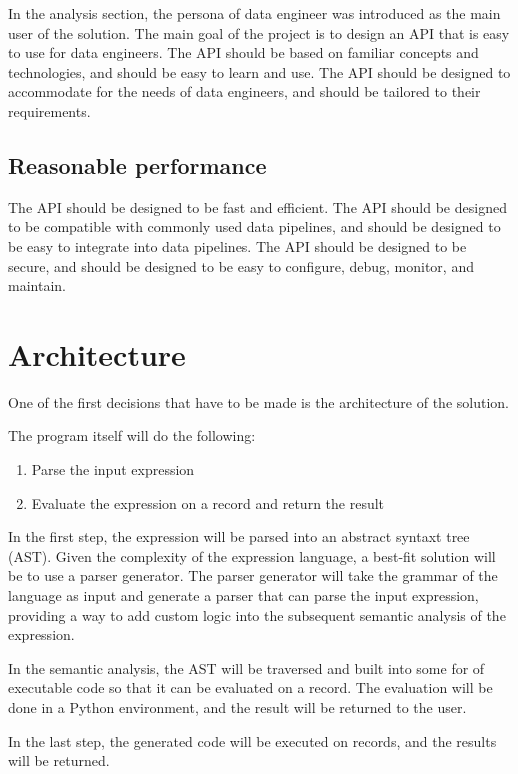 In the analysis section, the persona of data engineer was introduced as the main user of the solution. The main goal of the project is to design an API that is easy to use for data engineers. The API should be based on familiar concepts and technologies, and should be easy to learn and use. The API should be designed to accommodate for the needs of data engineers, and should be tailored to their requirements.

\subsection{Reasonable performance}

The API should be designed to be fast and efficient. The API should be designed to be compatible with commonly used data pipelines, and should be designed to be easy to integrate into data pipelines. The API should be designed to be secure, and should be designed to be easy to configure, debug, monitor, and maintain.

\section{Architecture}

One of the first decisions that have to be made is the architecture of the solution.

The program itself will do the following:

\begin{enumerate}
    \item Parse the input expression
    \item Evaluate the expression on a record and return the result
\end{enumerate}

In the first step, the expression will be parsed into an abstract syntaxt tree (AST). Given the complexity of the expression language, a best-fit solution will be to use a parser generator. The parser generator will take the grammar of the language as input and generate a parser that can parse the input expression, providing a way to add custom logic into the subsequent semantic analysis of the expression.

In the semantic analysis, the AST will be traversed and built into some for of executable code so that it can be evaluated on a record. The evaluation will be done in a Python environment, and the result will be returned to the user.

In the last step, the generated code will be executed on records, and the results will be returned.

